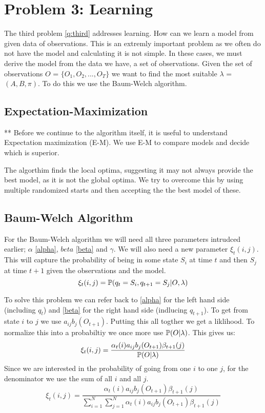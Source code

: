\section{Problem 3: Learning}
The third problem \ref{q:third} addresses learning. How can we learn a model from given data of observations. This is an extremly important problem as we often do not have the model and calculating it is not simple. In these cases, we must derive the model from the data we have, a set of observations. Given the set of observations $O$ = $\{O_1,O_2,...,O_T\}$ we want to find the most suitable $\lambda$ = $(A,B,\pi)$. To do this we use the Baum-Welch algorithm.


\subsection{Expectation-Maximization} **
Before we continue to the algorithm itself, it is useful to understand Expectation maximization (E-M). We use E-M to compare models and decide which is superior. 


The algorthim finds the local optima, suggesting it may not always provide the best model, as it is not the global optima. We try to overcome this by using multiple randomized starts and then accepting the the best model of these. 


\subsection{Baum-Welch Algorithm}
For the Baum-Welch algorithm we will need all three parameters intrudced earlier; $\alpha$ \ref{alpha}, $beta$ \ref{beta} and $\gamma$. We will also need a new parameter $\xi_t(i,j)$. This will capture the probability of being in some state $S_i$ at time $t$ and then $S_j$ at time $t+1$ given the observations and the model.
\begin{equation}
    \xi_t(i,j) = \mathbb{P} (q_t = S_i, q_{t+1} = S_j | O, \lambda)
\end{equation} 

To solve this problem we can refer back to \ref{alpha} for the left hand side (including $q_t$) and \ref{beta} for the right hand side (indlucing $q_{t+1}$). To get from state $i$ to $j$ we use $a_{ij} b_j(O_{t+1})$. Putting this all togther we get a liklihood. To normalize this into a probabiltiy we once more use $\mathbb{P} (O|\lambda)$. This gives us:
\begin{equation}
    \xi_t(i,j) = \dfrac{\alpha_t(i) a_{ij} b_j(O_{t+1}) \beta_{t+1}(j)}{\mathbb{P} (O|\lambda)}
\end{equation}
Since we are interested in the probability of going from one $i$ to one $j$, for the denominator we use the sum of all $i$ and all $j$. 
\begin{equation}
    \xi_t(i,j) = \dfrac{\alpha_t(i) a_{ij} b_j(O_{t+1}) \beta_{t+1}(j)}{\sum_{i=1}^N \sum_{j=1}^N \alpha_t(i) a_{ij} b_j(O_{t+1}) \beta_{t+1}(j)}
\end{equation}

